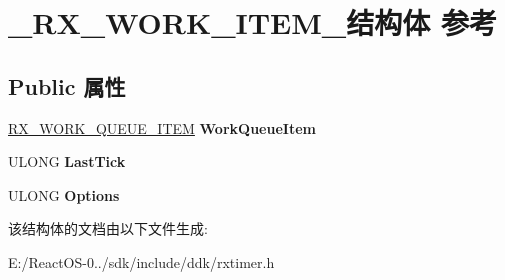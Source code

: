 \hypertarget{struct___r_x___w_o_r_k___i_t_e_m__}{}\section{\+\_\+\+R\+X\+\_\+\+W\+O\+R\+K\+\_\+\+I\+T\+E\+M\+\_\+结构体 参考}
\label{struct___r_x___w_o_r_k___i_t_e_m__}
\subsection*{Public 属性}
\begin{DoxyCompactItemize}
\item 
\mbox{\label{struct___r_x___w_o_r_k___i_t_e_m___a52d4f47df9f08dcdb43e35a63b621bea}} 
\hyperlink{struct___r_x___w_o_r_k___q_u_e_u_e___i_t_e_m__}{R\+X\+\_\+\+W\+O\+R\+K\+\_\+\+Q\+U\+E\+U\+E\+\_\+\+I\+T\+EM} {\bfseries Work\+Queue\+Item}
\item 
\mbox{\label{struct___r_x___w_o_r_k___i_t_e_m___abe94ede1ee513012e3b6e66e22e5abae}} 
U\+L\+O\+NG {\bfseries Last\+Tick}
\item 
\mbox{\label{struct___r_x___w_o_r_k___i_t_e_m___a57ca982b1e68d52f2f7276316da7828f}} 
U\+L\+O\+NG {\bfseries Options}
\end{DoxyCompactItemize}


该结构体的文档由以下文件生成\+:\begin{DoxyCompactItemize}
\item 
E\+:/\+React\+O\+S-\/0../sdk/include/ddk/rxtimer.\+h\end{DoxyCompactItemize}
